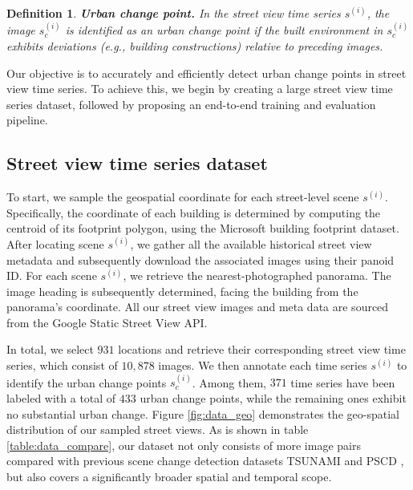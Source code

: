 \documentclass[letterpaper]{article} %
\newtheorem{definition}{Definition}
\begin{document}
\begin{definition}
\textbf{Urban change point.}
In the street view time series $s^{(i)}$, the image $s^{(i)}_{c}$ is identified as an urban change point if the built environment in $s^{(i)}_{c}$ exhibits deviations (e.g., building constructions) relative to preceding images.
\end{definition}

Our objective is to accurately and efficiently detect urban change points in street view time series. To achieve this, we begin by creating a large street view time series dataset, followed by proposing an end-to-end training and evaluation pipeline.

\subsection{Street view time series dataset}
To start, we sample the geospatial coordinate for each street-level scene $s^{(i)}$. Specifically, the coordinate of each building is determined by computing the centroid of its footprint polygon, using the Microsoft building footprint dataset.
After locating scene $s^{(i)}$, we gather all the available historical street view metadata and subsequently download the associated images using their panoid ID. For each scene $s^{(i)}$, we retrieve the nearest-photographed panorama. The image heading is subsequently determined, facing the building from the panorama's coordinate. All our street view images and meta data are sourced from the Google Static Street View API.


In total, we select $931$ locations and retrieve their corresponding street view time series, which consist of $10,878$ images. We then annotate each time series $s^{(i)}$ to identify the urban change points $s_c^{(i)}$. Among them, $371$ time series have been labeled with a total of $433$ urban change points, while the remaining ones exhibit no substantial urban change. Figure \ref{fig:data_geo} demonstrates the geo-spatial distribution of our sampled street views. 
As is shown in table \ref{table:data_compare}, our dataset not only consists of more image pairs compared with previous scene change detection datasets TSUNAMI \cite{Sakurada2015ChangeDF} and PSCD \cite{sakurada2020weakly}, but also covers a significantly broader spatial and temporal scope. 
\end{document}

